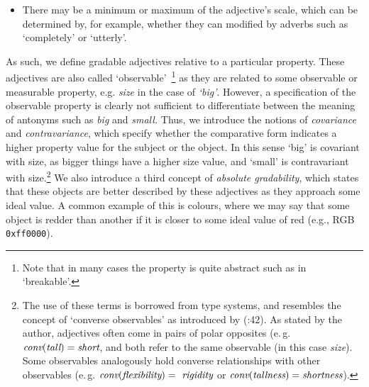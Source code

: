 \documentclass[11pt]{article}
\begin{document}
\begin{itemize}[noitemsep]
\item There may be a minimum or maximum of the adjective's scale, which can be determined
by, for example, whether they can modified by adverbs such as `completely' or `utterly'.
\end{itemize}

As such, we define gradable adjectives relative to a particular 
property. These adjectives are also called `observable'~\cite{Bennett06kr}\footnote{Note that in many cases the property is quite abstract such as in 
`breakable'.} as they are related to some observable or measurable property, e.g. \emph{size} in the case of \emph{`big'}. However, a specification of the observable property is clearly not sufficient to differentiate between the meaning of antonyms such as \emph{big} and \emph{small.}
Thus, we introduce the notions of \emph{covariance} and \emph{contravariance}, which specify 
whether the comparative form indicates a higher property value for the subject 
or the object. In this sense `big' is covariant with size, as bigger things have 
a higher size value, and `small' is contravariant with size.\footnote{
    The use of these terms is borrowed from type systems, and resembles the concept of `converse observables' as introduced by (\cite{Bennett06kr}:42). As stated by the author, adjectives often come in pairs of polar opposites (e.\,g. $\text{\em conv}(\text{\em tall})=\text{\em short}$, and both refer to the same observable (in this case \textit{size}). Some observables analogously hold converse relationships with other observables (e.\,g. $\text{\em conv}(\text{\em flexibility})=\text{\em rigidity}$ or $\text{\em conv}(\text{\em tallness})=\text{\em shortness}$).} 
    We also introduce 
a third concept of \emph{absolute gradability}, which states that these objects 
are better described by these adjectives as they approach some ideal value. 
A common example of this is colours, where we may say that some object is 
redder than another if it is closer to some ideal value of red 
(e.g., RGB {\tt 0xff0000}).
\end{document}
